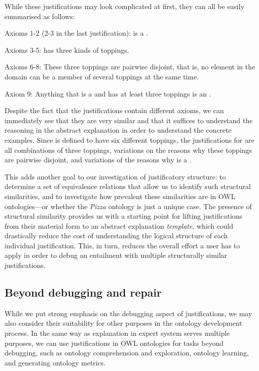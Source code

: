 While these justifications may look complicated at first, they can all be easily summarised as follows:
\begin{compactitem}
\item Axioms 1-2 (2-3 in the last justification):  is a .
\item Axioms 3-5:  has three kinds of toppings.
\item Axioms 6-8: These three toppings are pairwise disjoint, that is, no element in the domain can be a member of several toppings at the same time.
\item Axiom 9: Anything that is a  and has at least three toppings is an .
\end{compactitem}

Despite the fact that the justifications contain different axioms, we can immediately see that they are very similar and that it suffices to understand the reasoning in the abstract explanation in order to understand the concrete examples. Since  is defined to have six different toppings, the justifications for  are all combinations of three toppings, variations on the reasons why these toppings are pairwise disjoint, and variations of the reasons why  is a . 

This adds another goal to our investigation of justificatory structure: to determine a set of equivalence relations that allow us to identify such structural similarities, and to investigate how prevalent these similarities are in OWL ontologies---or whether the \emph{Pizza} ontology is just a unique case. The presence of structural similarity provides us with a starting point for lifting justifications from their material form to an abstract explanation \emph{template}, which could drastically reduce the cost of understanding the logical structure of each individual justification. This, in turn, reduces the overall effort a user has to apply in order to debug an entailment with multiple structurally similar justifications.


\subsection{Beyond debugging and repair}

While we put strong emphasis on the debugging aspect of justifications, we may also consider their suitability for other purposes in the ontology development process. In the same way as explanation in expert system serves multiple purposes, we can use justifications in OWL ontologies for tasks beyond debugging, such as ontology comprehension and exploration, ontology learning, and generating ontology metrics.

